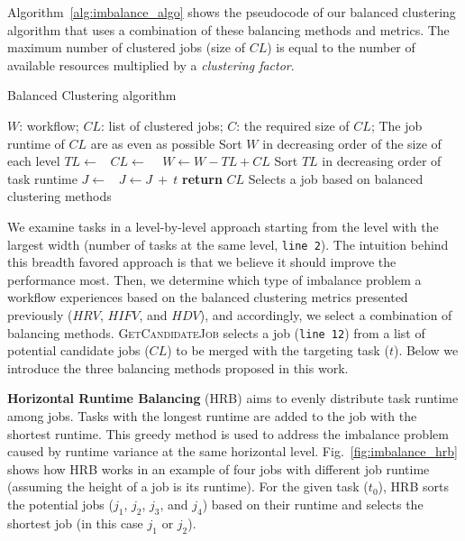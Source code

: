 Algorithm~\ref{alg:imbalance_algo} shows the pseudocode of our balanced clustering algorithm that uses a combination of these balancing methods and metrics.  The maximum number of clustered jobs (size of $CL$) is equal to the number of available resources multiplied by a \emph{clustering factor}. 

\begin{algorithm}[htb]
	\caption{ Balanced Clustering algorithm}
	\footnotesize
	\label{alg:imbalance_algo}
	\begin{algorithmic}[1]
		\Require $W$: workflow; $CL$: list of clustered jobs; $C$: the required size of $CL$; 
		\Ensure The job runtime of $CL$ are as even as possible
			\State Sort $W$ in decreasing order of the size of each level
				\State $TL\gets $\  
				\State $CL\gets$  \  
				\State $W \gets W - TL + CL$   
			\EndFor
		\EndProcedure
			\State Sort $TL$ in decreasing order of task runtime
				\State $J \gets $\  
				\State  $J \gets J\ +\ t$ 
			\EndFor
			\State \textbf{return} $CL$
		\EndProcedure
			\State Selects a job based on balanced clustering methods
		\EndProcedure
	\end{algorithmic}
\end{algorithm}

We examine tasks in a level-by-level approach starting from the level with the largest width (number of tasks at the same level, \texttt{line 2}). The intuition behind this breadth favored approach is that we believe it should improve the performance most. Then, we determine which type of imbalance problem a workflow experiences based on the balanced clustering metrics presented previously ($HRV$, $HIFV$, and $HDV$), and accordingly, we select a combination of balancing methods. \textsc{GetCandidateJob} selects a job (\texttt{line 12}) from a list of potential candidate jobs ($CL$) to be merged with the targeting task ($t$). Below we introduce the three balancing methods proposed in this work.

\textbf{Horizontal Runtime Balancing} (HRB) aims to evenly distribute task runtime among jobs. Tasks with the longest runtime are added to the job with the shortest runtime. This greedy method is used to address the imbalance problem caused by runtime variance at the same horizontal level. Fig.~\ref{fig:imbalance_hrb} shows how HRB works in an example of four jobs with different job runtime (assuming the height of a job is its runtime). For the given task ($t_0$), HRB sorts the potential jobs ($j_1$, $j_2$, $j_3$, and $j_4$) based on their runtime and selects the shortest job (in this case $j_1$ or $j_2$). 

